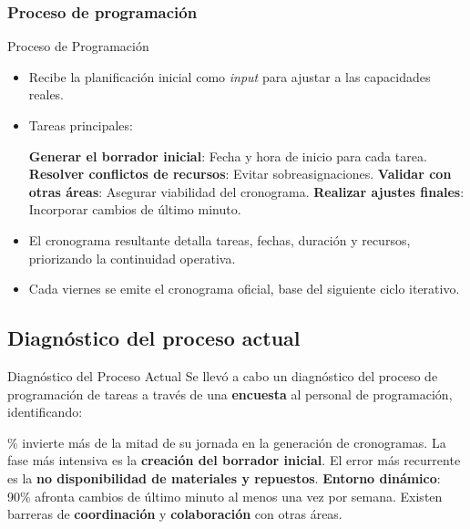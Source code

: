 \documentclass[pdfpagelabels=false, usepdftitle=false, aspectratio=169]{beamer}
\begin{document}
\subsubsection{Proceso de programación}
\begin{frame}{Proceso de Programación}
\begin{itemize}
    \item Recibe la planificación inicial como \textit{input} para ajustar a las capacidades reales.
    \vfill
    \item Tareas principales:
    \begin{itemize}
        \arrowitem \textbf{Generar el borrador inicial}: Fecha y hora de inicio para cada tarea.
        \arrowitem \textbf{Resolver conflictos de recursos}: Evitar sobreasignaciones.
        \arrowitem \textbf{Validar con otras áreas}: Asegurar viabilidad del cronograma.
        \arrowitem \textbf{Realizar ajustes finales}: Incorporar cambios de último minuto.
    \end{itemize}
    \vfill
    \item El cronograma resultante detalla tareas, fechas, duración y recursos, priorizando la continuidad operativa.
    \vfill
    \item Cada viernes se emite el cronograma oficial, base del siguiente ciclo iterativo.
\end{itemize}
\vfill
\end{frame}



\subsection{Diagnóstico del proceso actual}
\begin{frame}{Diagnóstico del Proceso Actual}
    Se llevó a cabo un diagnóstico del proceso de programación de tareas a través de una \textbf{encuesta} al personal de programación, identificando:
    \vfill
\begin{itemize}
    \% invierte más de la mitad de su jornada en la generación de cronogramas.
    \arrowitem La fase más intensiva es la \textbf{creación del borrador inicial}.
    \arrowitem El error más recurrente es la \textbf{no disponibilidad de materiales y repuestos}.
    \arrowitem \textbf{Entorno dinámico}: 90\% afronta cambios de último minuto al menos una vez por semana.
    \arrowitem Existen barreras de \textbf{coordinación} y \textbf{colaboración} con otras áreas.
\end{itemize}
\vfill
\end{frame}
\end{document}
